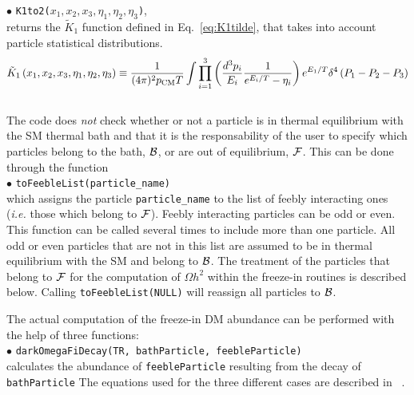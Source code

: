 \documentclass[12pt,a4paper]{article}
\begin{document}
\noindent$ \bullet$ \verb|K1to2(|$x_1,x_2,x_3,\eta_1,\eta_2,\eta_3$\verb|)|,\\
 returns the $\tilde{K}_1$ function defined in Eq.~\eqref{eq:K1tilde}, that takes into account particle statistical distributions.  
 \begin{equation}\label{eq:K1tilde}
\tilde K_1 \left( x_1, x_2, x_3, \eta_1, \eta_2, \eta_3 \right)  \equiv
\frac{1}{(4\pi)^2 p_{\rm CM} T} \int \prod\limits_{i=1}^{3} \left( \frac{d^3 p_i}{E_i} \frac{1}{e^{E_i/T} - \eta_i} \right) e^{E_1/T} \delta^4 \left( P_1 - P_2 - P_3 \right) 
\end{equation}
\\
The code does \textit{not} check whether or not a particle is in thermal equilibrium with the SM thermal bath and that it is the responsability of the user to specify which particles belong to the bath, ${\cal B}$, or are out of equilibrium, ${\cal F}$. This can be done through the function\\
\noindent
$\bullet$ \verb|toFeebleList(particle_name)|\\
which assigns the particle \verb|particle_name| to the list of feebly interacting ones (\textit{i.e.} those which belong to ${\cal F}$). Feebly interacting particles can be odd or even.   
This function can be called several times to include more than one particle.  All  odd or even particles that are not in this list are assumed to be in thermal equilibrium with the SM and belong to ${\cal B}$. 
The treatment of the particles that belong to  ${\cal F}$ for the computation of $\Omega h^2$ within the freeze-in routines is described below. 
Calling \verb|toFeebleList(NULL)| will reassign all particles to ${\cal B}$. 


The actual computation of the freeze-in DM abundance can be performed with the help of three functions:\\
\noindent
$\bullet$ \verb|darkOmegaFiDecay(TR, bathParticle, feebleParticle) | \\
calculates the abundance of {\tt feebleParticle} resulting  from the  decay of {\tt bathParticle}
The equations used for the three different cases are described in ~\cite{Belanger:2018ccd}.\\
\end{document}
